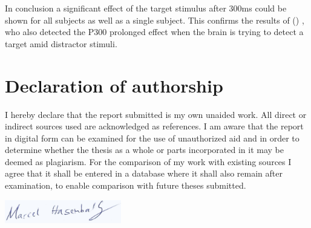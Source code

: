 \documentclass[a4paper]{article}
\newcommand{\caay}[2][]{
\citeauthor{#2} (\citeyear[#1]{#2})\xspace
}
\begin{document}
In conclusion a significant effect of the target stimulus after 300ms could be shown for all subjects as well as a single subject.
This confirms the results of \caay{Kappenman2021}, who also detected the P300 prolonged effect when the brain is trying to detect a target amid distractor stimuli.

\newpage
{}


\FloatBarrier
\section{Declaration of authorship}
I hereby declare that the report submitted is my own unaided work. 
All direct or indirect sources used are acknowledged as references.
I am aware that the report in digital form can be examined for the use of unauthorized aid and in order to determine whether the thesis as a whole or parts incorporated in it may be deemed as plagiarism. 
For the comparison of my work with existing sources I agree that it shall be entered in a database where it shall also remain after examination, to enable comparison with future theses submitted.
	\begin{flushleft}
    	\includegraphics[width=2in]{signature} %
	\end{flushleft}
\newpage
\printbibliography
\end{document}
